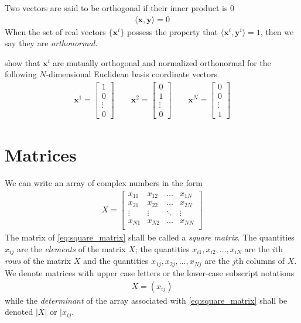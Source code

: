 Two vectors are said to be orthogonal if their inner product is $0$ \ie 
%
\begin{align}
	\langle \bm{x}, \bm{y}\rangle = 0
\end{align}
%
When the set of real vectors $\{\bm{x}^i\}$ possess the property that $\langle \bm{x}^i, \bm{y}^i\rangle = 1$, then we say they are \textit{orthonormal.}
%
\begin{homework}
	show that $\bm{x}^i$ are mutually orthogonal and normalized \ie orthonormal for the following $N$-dimensional Euclidean basis coordinate vectors
	\begin{align}
		\bm{x}^1 = \begin{bmatrix}
		1 \\ 0 \\ \vdots \\ 0
		\end{bmatrix}
		\qquad
		\bm{x}^2 = \begin{bmatrix}
		0 \\ 1 \\ \vdots \\ 0
		\end{bmatrix}
		\qquad
		\bm{x}^N = \begin{bmatrix}
		0 \\ 0 \\ \vdots \\ 1
		\end{bmatrix}
	\end{align}
\end{homework}

\section{Matrices}
%
We can write an array of complex numbers in the form 
%
\begin{align}
	X = \begin{bmatrix}
	x_{11} & x_{12} & \ldots & x_{1N} \\
	x_{21} & x_{22} & \ldots & x_{2N} \\
	\vdots & \vdots & \ddots & \vdots \\
	x_{N1} & x_{N2} & \ldots & x_{NN} \\
	\end{bmatrix}
	\label{eq:square_matrix}
\end{align}
%
The matrix of \eqref{eq:square_matrix} shall be called a \textit{square matrix}. The quantities $x_{ij}$ are the \textit{elements} of the matrix $X$; the quantities $x_{i1}, x_{i2}, \ldots,  x_{iN}$ are the $i$th \textit{rows} of the matrix $X$ and the quantities $x_{1j}, x_{2j}, \ldots,  x_{Nj}$ are the $j$th columns of $X$. We denote matrices with upper case letters or the lower-case subscript notations 
%
\begin{align}
	X = \left(x_{ij}\right)
\end{align}
%
while the \textit{determinant} of the array associated with \eqref{eq:square_matrix} shall be denoted $|X|$ or $|x_{ij}$.

